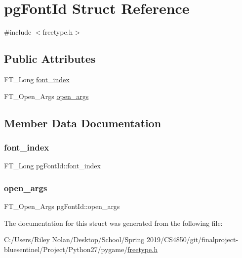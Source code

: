 \hypertarget{structpg_font_id}{}\section{pg\+Font\+Id Struct Reference}
\label{structpg_font_id}


{\ttfamily \#include $<$freetype.\+h$>$}

\subsection*{Public Attributes}
\begin{DoxyCompactItemize}
\item 
F\+T\+\_\+\+Long \mbox{\hyperlink{structpg_font_id_abf72307e8891094adc8441776831f9e7}{font\+\_\+index}}
\item 
F\+T\+\_\+\+Open\+\_\+\+Args \mbox{\hyperlink{structpg_font_id_aff2cf7d8769cd50dfc531f0993c56716}{open\+\_\+args}}
\end{DoxyCompactItemize}


\subsection{Member Data Documentation}
\mbox{\label{structpg_font_id_abf72307e8891094adc8441776831f9e7}} 
\subsubsection{\texorpdfstring{font\_index}{font\_index}}
{\footnotesize\ttfamily F\+T\+\_\+\+Long pg\+Font\+Id\+::font\+\_\+index}

\mbox{\label{structpg_font_id_aff2cf7d8769cd50dfc531f0993c56716}} 
\subsubsection{\texorpdfstring{open\_args}{open\_args}}
{\footnotesize\ttfamily F\+T\+\_\+\+Open\+\_\+\+Args pg\+Font\+Id\+::open\+\_\+args}



The documentation for this struct was generated from the following file\+:\begin{DoxyCompactItemize}
\item 
C\+:/\+Users/\+Riley Nolan/\+Desktop/\+School/\+Spring 2019/\+C\+S4850/git/finalproject-\/bluesentinel/\+Project/\+Python27/pygame/\mbox{\hyperlink{freetype_8h}{freetype.\+h}}\end{DoxyCompactItemize}
